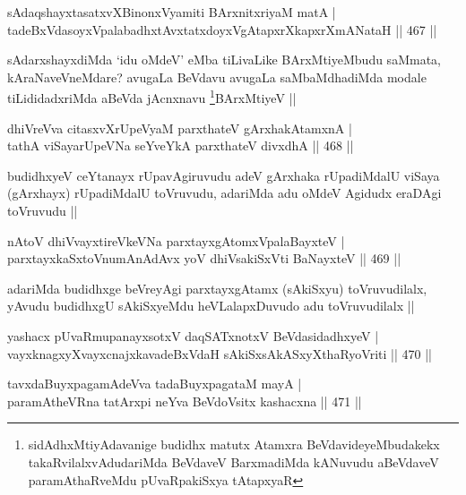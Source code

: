 \begin{shl}
sAdaqshayxtasatxvXBinonxV\s yamiti BArxnitxriyaM matA | \\
tadeBxVdasoyxVpalabadhxtAvxtatxdoyxVgAtapxrXkapxrXmANataH \hfill||  467 ||  
\end{shl}

\begin{artha}
sAdarxshayxdiMda `idu oMdeV' eMba tiLivaLike BArxMtiyeMbudu saMmata, kAraNaveVneMdare? avugaLa BeVdavu avugaLa saMbaMdhadiMda modale tiLididadxriMda aBeVda jAcnxnavu \footnote{sidAdhxMtiyAdavanige budidhx matutx Atamxra BeVdavideyeMbudakekx takaRvilalxvAdudariMda BeVdaveV BarxmadiMda kANuvudu aBeVdaveV paramAthaRveMdu pUvaRpakiSxya tAtapxyaR}BArxMtiyeV ||
\end{artha}

\begin{shl}
dhiVreVva citasxvXrUpeVyaM parxthateV gArxhakAtamxnA | \\
tathA viSayarUpeVNa seYveYkA parxthateV divxdhA \hfill||  468 ||  
\end{shl}

\begin{artha}
budidhxyeV ceYtanayx rUpavAgiruvudu adeV gArxhaka rUpadiMdalU viSaya (gArxhayx) rUpadiMdalU toVruvudu, adariMda adu oMdeV Agidudx eraDAgi toVruvudu ||
\end{artha}

\begin{shl}
nAtoV dhiVvayxtireVkeVNa parxtayxgAtomxVpalaBayxteV | \\
parxtayxkaSxtoV\s numAnAdAvx yoV dhiVsakiSxVti BaNayxteV \hfill||  469 ||  
\end{shl}

\begin{artha}
adariMda budidhxge beVreyAgi parxtayxgAtamx (sAkiSxyu) toVruvudilalx, yAvudu budidhxgU sAkiSxyeMdu heVLalapxDuvudo adu toVruvudilalx ||
\end{artha}

\begin{shl}
yashacx pUvaRmupanayxsotxV daqSATxnotxV BeVdasidadhxyeV | \\
vayxknagxyXvayxcnajxkavadeBxVdaH sAkiSxsAkASxyXthaRyoVriti \hfill||  470 ||  
\end{shl}
				
\begin{shl}
tavxdaBuyxpagamAdeVva tadaBuyxpagataM mayA | \\
paramAtheVRna tatArxpi neYva BeVdoV\s sitx kashacxna \hfill||  471 ||  
\end{shl}

